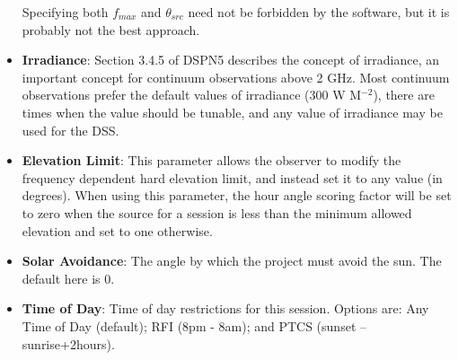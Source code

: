 \begin{itemize}
Specifying both $f_{max}$ and $\theta_{src}$ need not be forbidden by the software, but 
it is probably not the best approach.
\item {\bf Irradiance}: Section 3.4.5 of DSPN5 describes the concept of irradiance, an important concept for
continuum observations above 2 GHz.  Most continuum observations prefer the default values of
irradiance (300 W M$^{-2}$), there are times when the value
should be tunable, and any value of irradiance may be used for the DSS.
\item {\bf Elevation Limit}: This parameter allows the observer to modify the frequency dependent
hard elevation limit, and instead set it to any value (in degrees).  When using this parameter, 
the hour angle scoring factor will be set to zero when the source for a session is less than the minimum allowed elevation and set to one otherwise.
\item {\bf Solar Avoidance}: The angle by which the project must avoid the sun.  The default here is 0.
\item {\bf Time of Day}: Time of day restrictions for this session.  Options are: Any Time of Day (default); RFI (8pm - 8am);
and PTCS (sunset -- sunrise+2hours).


\end{itemize}
